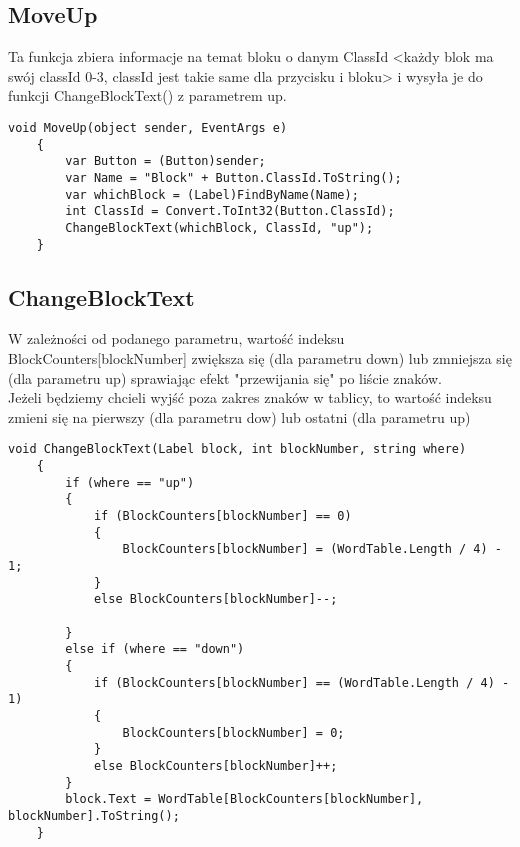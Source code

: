 \subsection{MoveUp}
\hspace{0.60cm}Ta funkcja zbiera informacje na temat bloku o danym ClassId <każdy blok ma swój classId 0-3, classId jest takie same dla przycisku i bloku> i wysyła je do funkcji ChangeBlockText() z parametrem up. 
\begin{lstlisting}[caption=MoveUp]
	void MoveUp(object sender, EventArgs e)
	{
		var Button = (Button)sender;
		var Name = "Block" + Button.ClassId.ToString();
		var whichBlock = (Label)FindByName(Name);
		int ClassId = Convert.ToInt32(Button.ClassId);
		ChangeBlockText(whichBlock, ClassId, "up");
	}
\end{lstlisting}

\subsection{ChangeBlockText}
\hspace{0.60cm}W zależności od podanego parametru, wartość indeksu BlockCounters[blockNumber] zwiększa się (dla parametru down) lub zmniejsza się (dla parametru up) sprawiając efekt "przewijania się" po liście znaków. 
\\Jeżeli będziemy chcieli wyjść poza zakres znaków w tablicy, to wartość indeksu zmieni się na pierwszy (dla parametru dow) lub ostatni (dla parametru up)
\begin{lstlisting}[caption=ChangeBlockText]
	        void ChangeBlockText(Label block, int blockNumber, string where)
	{
		if (where == "up")
		{
			if (BlockCounters[blockNumber] == 0)
			{
				BlockCounters[blockNumber] = (WordTable.Length / 4) - 1;
			}
			else BlockCounters[blockNumber]--;
			
		}
		else if (where == "down")
		{
			if (BlockCounters[blockNumber] == (WordTable.Length / 4) - 1)
			{
				BlockCounters[blockNumber] = 0;
			}
			else BlockCounters[blockNumber]++;
		}
		block.Text = WordTable[BlockCounters[blockNumber], blockNumber].ToString();
	}
\end{lstlisting}

